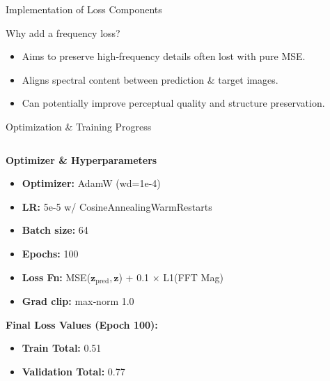 \documentclass[10pt]{beamer}
\begin{document}
\begin{frame}[fragile]{Implementation of Loss Components}
  \vspace{-0.3cm}
  \begin{alertblock}{Why add a frequency loss?}
    \footnotesize
    \begin{itemize} \itemsep 0pt
      \item Aims to preserve high‑frequency details often lost with pure MSE.
      \item Aligns spectral content between prediction \& target images.
      \item Can potentially improve perceptual quality and structure preservation.
    \end{itemize}
  \end{alertblock}

\end{frame}

\begin{frame}{Optimization \& Training Progress}
  \begin{columns}[T]
    \begin{column}{0.45\textwidth}
      \textbf{Optimizer \& Hyperparameters}
      \begin{itemize}\small\itemsep0.2em
        \item \textbf{Optimizer:} AdamW (wd=1e-4)
        \item \textbf{LR:} 5e-5 w/ CosineAnnealingWarmRestarts
        \item \textbf{Batch size:} 64
        \item \textbf{Epochs:} 100
        \item \textbf{Loss Fn:} MSE($\mathbf{z}_\text{pred}, \mathbf{z}$) + 0.1 $\times$ L1(FFT Mag)
        \item \textbf{Grad clip:} max‐norm 1.0
      \end{itemize}

      \medskip
      \textbf{Final Loss Values (Epoch 100):}
      \begin{itemize}\small\itemsep0.2em
        \item \textbf{Train Total:} 0.51
        \item \textbf{Validation Total:} 0.77
      \end{itemize}


\end{column}
\end{columns}
\end{frame}
\end{document}
